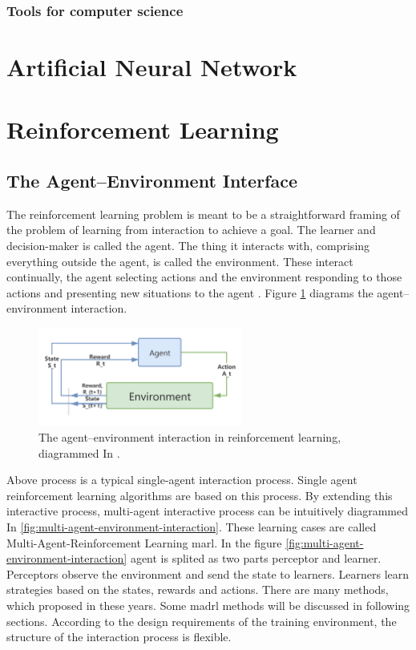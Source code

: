 \subsubsection{Tools for computer science}

\section{Artificial Neural Network}

\section{Reinforcement Learning}
\subsection{The Agent–Environment Interface}
The reinforcement learning problem is meant to be a straightforward framing
of the problem of learning from interaction to achieve a goal. The learner and
decision-maker is called the agent. The thing it interacts with, comprising
everything outside the agent, is called the environment. These interact continually, the agent selecting actions and the environment responding to those
actions and presenting new situations to the agent \parencite{Sutton2018}. 
Figure \ref{fig:agent-environment-interaction} diagrams the agent–environment interaction.

\begin{figure}[htbp]
\centering
\includegraphics[width=0.6\textwidth]{./images/agent-environment-interaction.png}
\caption{The agent–environment interaction in reinforcement learning, diagrammed In \parencite{Sutton2018}.}
\label{fig:agent-environment-interaction}
\end{figure}

Above process is a typical single-agent interaction process. Single agent reinforcement learning algorithms are based on this process. By extending this interactive process, multi-agent interactive process can be intuitively diagrammed In \ref{fig:multi-agent-environment-interaction}. These learning cases are called Multi-Agent-Reinforcement Learning \gls{marl}. In the figure \ref{fig:multi-agent-environment-interaction} agent is splited as two parts perceptor and learner. Perceptors observe the environment and send the state to learners. Learners learn strategies based on the states, rewards and actions. There are many methods, which proposed in these years. Some \gls{madrl} methods will be discussed in following sections. According to the design requirements of the training environment, the structure of the interaction process is flexible.

